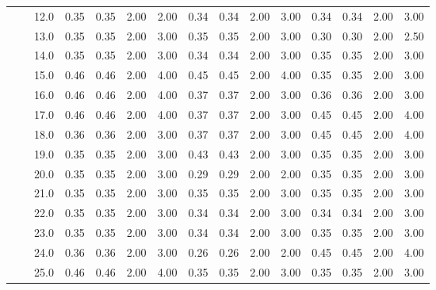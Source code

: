 \begin{tabular}{lllrrrrrrrrrrrr}
       &     & 12.0 &       0.35 &      0.35 & 2.00 &   2.00 &       0.34 &      0.34 & 2.00 &   3.00 &       0.34 &      0.34 & 2.00 &   3.00 \\
       &     & 13.0 &       0.35 &      0.35 & 2.00 &   3.00 &       0.35 &      0.35 & 2.00 &   3.00 &       0.30 &      0.30 & 2.00 &   2.50 \\
       &     & 14.0 &       0.35 &      0.35 & 2.00 &   3.00 &       0.34 &      0.34 & 2.00 &   3.00 &       0.35 &      0.35 & 2.00 &   3.00 \\
       &     & 15.0 &       0.46 &      0.46 & 2.00 &   4.00 &       0.45 &      0.45 & 2.00 &   4.00 &       0.35 &      0.35 & 2.00 &   3.00 \\
       &     & 16.0 &       0.46 &      0.46 & 2.00 &   4.00 &       0.37 &      0.37 & 2.00 &   3.00 &       0.36 &      0.36 & 2.00 &   3.00 \\
       &     & 17.0 &       0.46 &      0.46 & 2.00 &   4.00 &       0.37 &      0.37 & 2.00 &   3.00 &       0.45 &      0.45 & 2.00 &   4.00 \\
       &     & 18.0 &       0.36 &      0.36 & 2.00 &   3.00 &       0.37 &      0.37 & 2.00 &   3.00 &       0.45 &      0.45 & 2.00 &   4.00 \\
       &     & 19.0 &       0.35 &      0.35 & 2.00 &   3.00 &       0.43 &      0.43 & 2.00 &   3.00 &       0.35 &      0.35 & 2.00 &   3.00 \\
       &     & 20.0 &       0.35 &      0.35 & 2.00 &   3.00 &       0.29 &      0.29 & 2.00 &   2.00 &       0.35 &      0.35 & 2.00 &   3.00 \\
       &     & 21.0 &       0.35 &      0.35 & 2.00 &   3.00 &       0.35 &      0.35 & 2.00 &   3.00 &       0.35 &      0.35 & 2.00 &   3.00 \\
       &     & 22.0 &       0.35 &      0.35 & 2.00 &   3.00 &       0.34 &      0.34 & 2.00 &   3.00 &       0.34 &      0.34 & 2.00 &   3.00 \\
       &     & 23.0 &       0.35 &      0.35 & 2.00 &   3.00 &       0.34 &      0.34 & 2.00 &   3.00 &       0.35 &      0.35 & 2.00 &   3.00 \\
       &     & 24.0 &       0.36 &      0.36 & 2.00 &   3.00 &       0.26 &      0.26 & 2.00 &   2.00 &       0.45 &      0.45 & 2.00 &   4.00 \\
       &     & 25.0 &       0.46 &      0.46 & 2.00 &   4.00 &       0.35 &      0.35 & 2.00 &   3.00 &       0.35 &      0.35 & 2.00 &   3.00 \\

\end{tabular}
